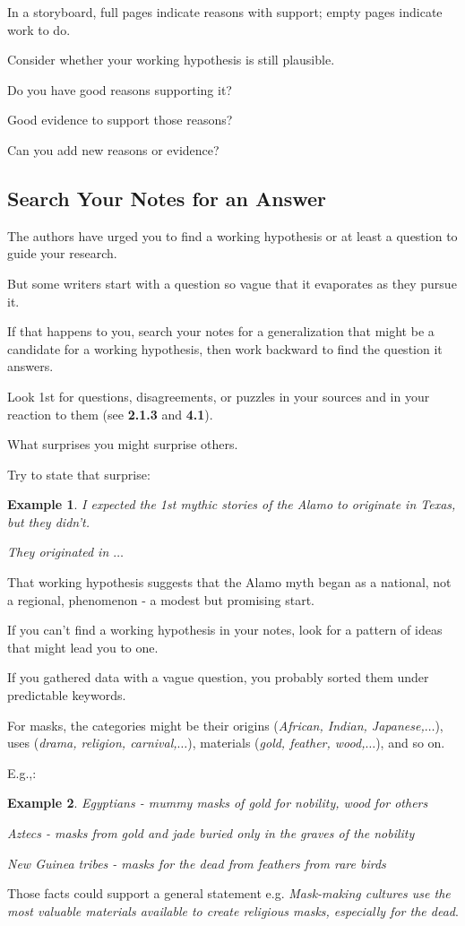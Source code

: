 \documentclass[oneside]{book}
\numberwithin{equation}{section}
\newtheorem{example}{Example}[section]
\begin{document}
In a storyboard, full pages indicate reasons with support; empty pages indicate work to do.

Consider whether your working hypothesis is still plausible.

Do you have good reasons supporting it?

Good evidence to support those reasons?

Can you add new reasons or evidence?

\subsection{Search Your Notes for an Answer}
The authors have urged you to find a working hypothesis or at least a question to guide your research.

But some writers start with a question so vague that it evaporates as they pursue it.

If that happens to you, search your notes for a generalization that might be a candidate for a working hypothesis, then work backward to find the question it answers.

%
Look 1st for questions, disagreements, or puzzles in your sources and in your reaction to them (see \textbf{2.1.3} and \textbf{4.1}).

What surprises you might surprise others.

Try to state that surprise:
\begin{example}
    I expected the 1st mythic stories of the Alamo to originate in Texas, but they didn't.
    
    They originated in $\ldots$
\end{example}
That working hypothesis suggests that the Alamo myth began as a national, not a regional, phenomenon - a modest but promising start.

%
If you can't find a working hypothesis in your notes, look for a pattern of ideas that might lead you to one.

If you gathered data with a vague question, you probably sorted them under predictable keywords.

For masks, the categories might be their origins (\textit{African, Indian, Japanese,$\ldots$}), uses (\textit{drama, religion, carnival,$\ldots$}), materials (\textit{gold, feather, wood,$\ldots$}), and so on.

E.g.,:
\begin{example}
    Egyptians - mummy masks of gold for nobility, wood for others
    
    Aztecs - masks from gold and jade buried only in the graves of the nobility
    
    New Guinea tribes - masks for the dead from feathers from rare birds
\end{example}
Those facts could support a general statement e.g. \textit{Mask-making cultures use the most valuable materials available to create religious masks, especially for the dead}.
\end{document}
